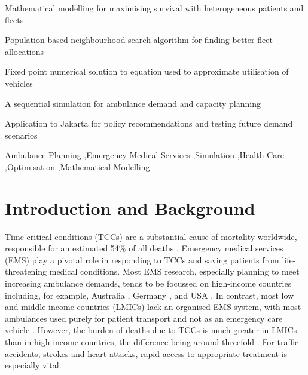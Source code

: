 \documentclass[preprint,12pt]{elsarticle}
\begin{document}
\begin{frontmatter}
\begin{abstract}
\end{abstract}


\begin{highlights}
\item Mathematical modelling for maximising survival with heterogeneous
      patients and fleets
\item Population based neighbourhood search algorithm for finding better fleet allocations
\item Fixed point numerical solution to equation used to approximate utilisation
    of vehicles
\item A sequential simulation for ambulance demand and capacity planning
\item Application to Jakarta for policy recommendations and testing future
      demand scenarios
\end{highlights}

\begin{keyword}
Ambulance Planning \sep Emergency Medical Services \sep Simulation \sep Health Care \sep Optimisation \sep Mathematical Modelling
\end{keyword}

\end{frontmatter}


\newpage


\section{Introduction and Background}\label{sec:intro}
Time-critical conditions (TCCs) are a substantial cause of mortality
worldwide, responsible for an estimated 54\% of all deaths \cite{FraserBMJ}.
Emergency medical services (EMS) play a pivotal role in responding to TCCs and
saving patients from life-threatening medical conditions. Most EMS research,
especially  planning to meet increasing ambulance demands, tends to be
focussed on high-income countries including, for example, Australia
\cite{lowthian2011increasing}, Germany \cite{veser2015demographic}, and USA
\cite{birmingham2021trends}. In contrast, most low and middle-income countries
(LMICs) lack an organised EMS system, with most ambulances used purely for
patient transport and not as an emergency care vehicle \cite{plummer2017ems}.
However, the burden of deaths due to TCCs is much greater in LMICs than in
high-income countries, the difference being around threefold \cite{ChangPMC}.
For traffic accidents, strokes and heart attacks, rapid access to appropriate
treatment is especially vital. 
\end{document}
